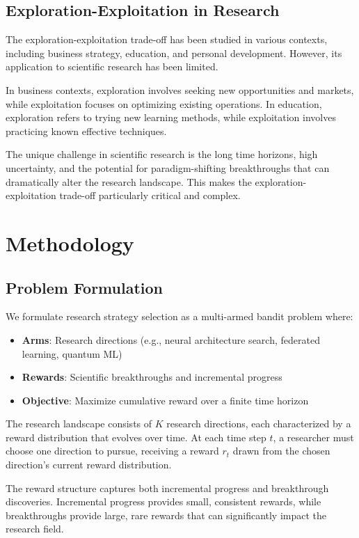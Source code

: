 \documentclass[letterpaper]{article} %
\begin{document}
\subsection{Exploration-Exploitation in Research}

The exploration-exploitation trade-off has been studied in various contexts, including business strategy, education, and personal development. However, its application to scientific research has been limited.

In business contexts, exploration involves seeking new opportunities and markets, while exploitation focuses on optimizing existing operations. In education, exploration refers to trying new learning methods, while exploitation involves practicing known effective techniques.

The unique challenge in scientific research is the long time horizons, high uncertainty, and the potential for paradigm-shifting breakthroughs that can dramatically alter the research landscape. This makes the exploration-exploitation trade-off particularly critical and complex.

\section{Methodology}

\subsection{Problem Formulation}

We formulate research strategy selection as a multi-armed bandit problem where:
\begin{itemize}
\item \textbf{Arms}: Research directions (e.g., neural architecture search, federated learning, quantum ML)
\item \textbf{Rewards}: Scientific breakthroughs and incremental progress
\item \textbf{Objective}: Maximize cumulative reward over a finite time horizon
\end{itemize}

The research landscape consists of $K$ research directions, each characterized by a reward distribution that evolves over time. At each time step $t$, a researcher must choose one direction to pursue, receiving a reward $r_t$ drawn from the chosen direction's current reward distribution.

The reward structure captures both incremental progress and breakthrough discoveries. Incremental progress provides small, consistent rewards, while breakthroughs provide large, rare rewards that can significantly impact the research field.
\end{document}
